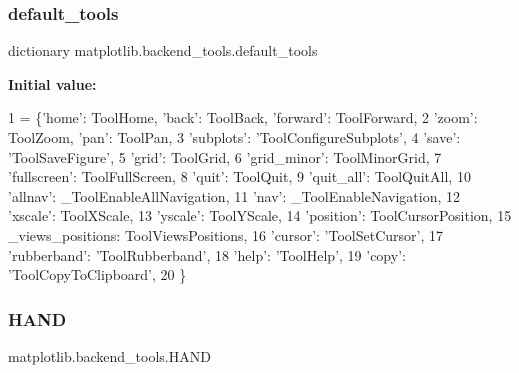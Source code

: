 \subsubsection{\texorpdfstring{default\+\_\+tools}{default\_tools}}
{\footnotesize\ttfamily dictionary matplotlib.\+backend\+\_\+tools.\+default\+\_\+tools}

{\bfseries Initial value\+:}
\begin{DoxyCode}
1 =  \{\textcolor{stringliteral}{'home'}: ToolHome, \textcolor{stringliteral}{'back'}: ToolBack, \textcolor{stringliteral}{'forward'}: ToolForward,
2                  \textcolor{stringliteral}{'zoom'}: ToolZoom, \textcolor{stringliteral}{'pan'}: ToolPan,
3                  \textcolor{stringliteral}{'subplots'}: \textcolor{stringliteral}{'ToolConfigureSubplots'},
4                  \textcolor{stringliteral}{'save'}: \textcolor{stringliteral}{'ToolSaveFigure'},
5                  \textcolor{stringliteral}{'grid'}: ToolGrid,
6                  \textcolor{stringliteral}{'grid\_minor'}: ToolMinorGrid,
7                  \textcolor{stringliteral}{'fullscreen'}: ToolFullScreen,
8                  \textcolor{stringliteral}{'quit'}: ToolQuit,
9                  \textcolor{stringliteral}{'quit\_all'}: ToolQuitAll,
10                  \textcolor{stringliteral}{'allnav'}: \_ToolEnableAllNavigation,
11                  \textcolor{stringliteral}{'nav'}: \_ToolEnableNavigation,
12                  \textcolor{stringliteral}{'xscale'}: ToolXScale,
13                  \textcolor{stringliteral}{'yscale'}: ToolYScale,
14                  \textcolor{stringliteral}{'position'}: ToolCursorPosition,
15                  \_views\_positions: ToolViewsPositions,
16                  \textcolor{stringliteral}{'cursor'}: \textcolor{stringliteral}{'ToolSetCursor'},
17                  \textcolor{stringliteral}{'rubberband'}: \textcolor{stringliteral}{'ToolRubberband'},
18                  \textcolor{stringliteral}{'help'}: \textcolor{stringliteral}{'ToolHelp'},
19                  \textcolor{stringliteral}{'copy'}: \textcolor{stringliteral}{'ToolCopyToClipboard'},
20                  \}
\end{DoxyCode}
\mbox{\label{namespacematplotlib_1_1backend__tools_a32dd4f4cca63a64acc998bbbe9cf5e5d}} 
\subsubsection{\texorpdfstring{H\+A\+ND}{HAND}}
{\footnotesize\ttfamily matplotlib.\+backend\+\_\+tools.\+H\+A\+ND}

